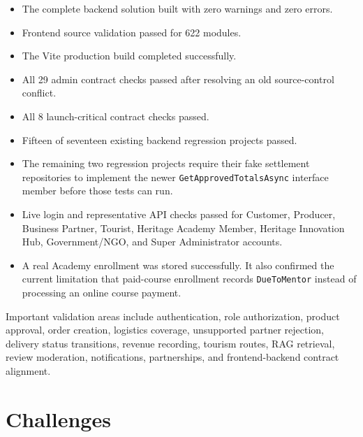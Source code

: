 \documentclass[12pt,a4paper]{report}
\begin{document}
\begin{itemize}
  \item The complete backend solution built with zero warnings and zero errors.
  \item Frontend source validation passed for 622 modules.
  \item The Vite production build completed successfully.
  \item All 29 admin contract checks passed after resolving an old source-control conflict.
  \item All 8 launch-critical contract checks passed.
  \item Fifteen of seventeen existing backend regression projects passed.
  \item The remaining two regression projects require their fake settlement repositories to implement the newer \texttt{GetApprovedTotalsAsync} interface member before those tests can run.
  \item Live login and representative API checks passed for Customer, Producer, Business Partner, Tourist, Heritage Academy Member, Heritage Innovation Hub, Government/NGO, and Super Administrator accounts.
  \item A real Academy enrollment was stored successfully. It also confirmed the current limitation that paid-course enrollment records \texttt{DueToMentor} instead of processing an online course payment.
\end{itemize}

Important validation areas include authentication, role authorization, product approval, order creation, logistics coverage, unsupported partner rejection, delivery status transitions, revenue recording, tourism routes, RAG retrieval, review moderation, notifications, partnerships, and frontend-backend contract alignment.

\chapter{Challenges}
\end{document}
